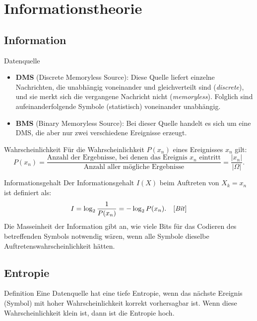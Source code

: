 \section{Informationstheorie}\label{sec:informationstheorie}

\subsection{Information}\label{subsec:information}

\begin{definition}{Datenquelle}
    \begin{itemize}
        \item \textbf{DMS} (Discrete Memoryless Source): Diese Quelle liefert einzelne Nachrichten, die unabhängig voneinander und gleichverteilt sind (\emph{discrete}), und sie merkt sich die vergangene Nachricht nicht (\emph{memoryless}).
        Folglich sind aufeinanderfolgende Symbole (statistisch) voneinander unabhängig.
        \item \textbf{BMS} (Binary Memoryless Source): Bei dieser Quelle handelt es sich um eine DMS, die aber nur zwei verschiedene Ereignisse erzeugt.
    \end{itemize}
\end{definition}

\begin{definition}{Wahrscheinlichkeit}
    Für die Wahrscheinlichkeit $P(x_n)$ eines Ereignisses $x_n$ gilt: \[P(x_n) = \frac{\text{Anzahl der Ergebnisse, bei denen das Ereignis $x_n$ eintritt}}{\text{Anzahl aller mögliche Ergebnisse}} = \frac{|x_n|}{|\Omega|}.\]
\end{definition}

\begin{definition}{Informationsgehalt}
    Der Informationsgehalt $I(X)$ beim Auftreten von $X_k = x_n$ ist definiert als: \[I = \log_2 \frac{1}{P(x_n)} = -\log_2 P(x_n). \quad \text{[\emph{Bit}]}\]
    Die Masseinheit der Information gibt an, wie viele Bits für das Codieren des betreffenden Symbols notwendig wären, wenn alle Symbole dieselbe Auftretenswahrscheinlichkeit hätten.
\end{definition}

\subsection{Entropie}\label{subsec:entropie}

\begin{definition}{Definition}
    Eine Datenquelle hat eine tiefe Entropie, wenn das nächste Ereignis (Symbol) mit hoher Wahrscheinlichkeit korrekt vorhersagbar ist.
    Wenn diese Wahrscheinlichkeit klein ist, dann ist die Entropie hoch.
\end{definition}

